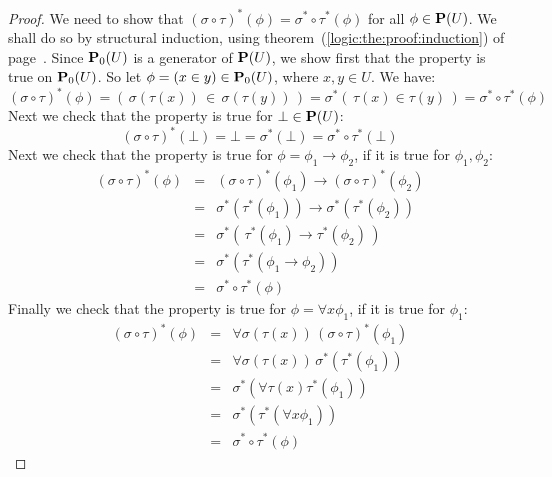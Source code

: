 \begin{proof}
We need to show that
$(\sigma\circ\tau)^{*}(\phi)=\sigma^{*}\circ\tau^{*}(\phi)$ for all
$\phi\in{\bf P}(U)$. We shall do so by structural induction, using
theorem~(\ref{logic:the:proof:induction}) of
page~\pageref{logic:the:proof:induction}. Since ${\bf P}_{0}(U)$ is
a generator of ${\bf P}(U)$, we show first that the property is true
on ${\bf P}_{0}(U)$. So let $\phi = (x\in y)\in{\bf P}_{0}(U)$,
where $x,y\in U$. We have:
    \[
        (\sigma\circ\tau)^{*}(\phi)
        =
        (\,\sigma(\tau(x))\,\in\,\sigma(\tau(y))\,)
        =
        \sigma^{*}(\,\tau(x)\in\tau(y)\,)
        =
        \sigma^{*}\circ\tau^{*}(\phi)
    \]
Next we check that the property is true for $\bot\in{\bf P}(U)$:
    \[
        (\sigma\circ\tau)^{*}(\bot)
        =
        \bot
        =
        \sigma^{*}(\bot)
        =
        \sigma^{*}\circ\tau^{*}(\bot)
    \]
Next we check that the property is true for
$\phi=\phi_{1}\to\phi_{2}$, if it is true for $\phi_{1},\phi_{2}$:
    \begin{eqnarray*}
        (\sigma\circ\tau)^{*}(\phi)
        &=&
        (\sigma\circ\tau)^{*}(\phi_{1})\to(\sigma\circ\tau)^{*}(\phi_{2})\\
        &=&
        \sigma^{*}(\tau^{*}(\phi_{1}))\to\sigma^{*}(\tau^{*}(\phi_{2}))\\
        &=&
        \sigma^{*}(\,\tau^{*}(\phi_{1})\to\tau^{*}(\phi_{2})\,)\\
        &=&
        \sigma^{*}(\tau^{*}(\phi_{1}\to\phi_{2}))\\
        &=&
        \sigma^{*}\circ\tau^{*}(\phi)
    \end{eqnarray*}
Finally we check that the property is true for $\phi=\forall
x\phi_{1}$, if it is true for $\phi_{1}$:
    \begin{eqnarray*}
    (\sigma\circ\tau)^{*}(\phi)&=&\forall \sigma(\tau(x))\,(\sigma\circ\tau)^{*}(\phi_{1})\\
    &=&\forall\sigma(\tau(x))\,\sigma^{*}(\tau^{*}(\phi_{1}))\\
    &=&\sigma^{*}(\forall\tau(x)\tau^{*}(\phi_{1}))\\
    &=&\sigma^{*}(\tau^{*}(\forall x\phi_{1}))\\
    &=&\sigma^{*}\circ\tau^{*}(\phi)
    \end{eqnarray*}
\end{proof}

